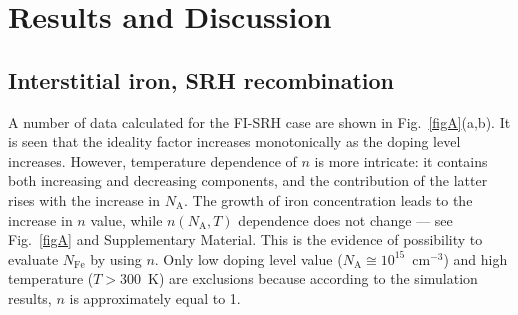 \documentclass [sort&compress] {elsarticle}
\begin{document}
\section{Results and Discussion}
\subsection{Interstitial iron, SRH recombination}

A number of data calculated for the FI-SRH case are shown in Fig.~\ref{figA}(a,b).
It is seen that the ideality factor increases monotonically as the doping level increases.
However, temperature dependence of $n$ is more intricate: it contains both increasing and decreasing components, and the contribution of the latter rises with the increase in $N_\mathrm{A}$.
The growth of iron concentration leads to the increase in $n$ value, while $n(N_\mathrm{A},T)$ dependence does not change --- see Fig.~\ref{figA} and Supplementary Material.
This is the evidence of possibility to evaluate $N_\mathrm{Fe}$ by using $n$.
Only low doping level value ($N_\mathrm{A}\cong10^{15}$~cm$^{-3}$) and high temperature ($T>300$~K) are exclusions
because according to the simulation results, $n$ is approximately equal to 1.
\end{document}
